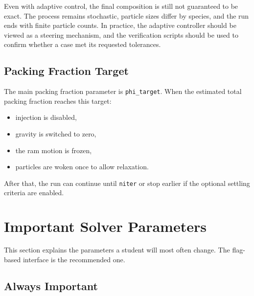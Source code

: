 \documentclass[11pt]{article}
\begin{document}
Even with adaptive control, the final composition is still not guaranteed to be exact. The process remains stochastic, particle sizes differ by species, and the run ends with finite particle counts. In practice, the adaptive controller should be viewed as a steering mechanism, and the verification scripts should be used to confirm whether a case met its requested tolerances.

\subsection{Packing Fraction Target}

The main packing fraction parameter is \texttt{phi\_target}. When the estimated total packing fraction reaches this target:
\begin{itemize}
  \item injection is disabled,
  \item gravity is switched to zero,
  \item the ram motion is frozen,
  \item particles are woken once to allow relaxation.
\end{itemize}

After that, the run can continue until \texttt{niter} or stop earlier if the optional settling criteria are enabled.

\section{Important Solver Parameters}

This section explains the parameters a student will most often change. The flag-based interface is the recommended one.

\subsection{Always Important}
\end{document}
